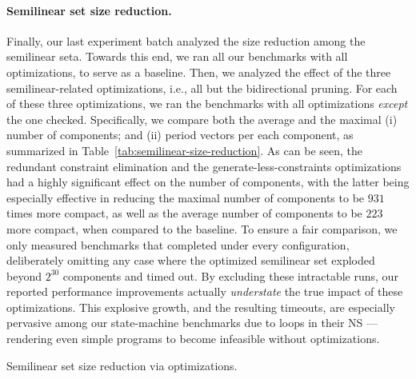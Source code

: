 \paragraph{Semilinear set size reduction.}

Finally, our last experiment batch analyzed the size reduction among the semilinear seta.
%
Towards this end, we ran all our benchmarks with all optimizations, to serve as a baseline. 
%
Then, we analyzed the effect of the three semilinear-related optimizations, i.e., all but the bidirectional pruning. For each of these three optimizations, we ran the benchmarks with all optimizations \textit{except} the one checked.
%
%
Specifically, we compare both the average and the maximal (i) number of components; and (ii) period vectors per each component, as summarized in Table~\ref{tab:semilinear-size-reduction}.
%
As can be seen, the redundant constraint elimination and the generate-less-constraints optimizations had a highly significant effect on the number of components, with the latter being especially effective in reducing the maximal number of components to be $931$ times more compact, as well as the average number of components to be $223$ more compact, when compared to the baseline.
%
To ensure a fair comparison, we only measured benchmarks that completed under every configuration, deliberately omitting any case where the optimized semilinear set exploded beyond $2^{30}$ components and timed out. By excluding these intractable runs, our reported performance improvements actually \textit{understate} the true impact of these optimizations. This explosive growth, and the resulting timeouts, are especially pervasive among our state-machine benchmarks due to loops in their NS --- rendering even simple programs to become infeasible without optimizations.




\begin{table}[htbp]
	\centering
	
	\caption{Semilinear set size reduction via optimizations.}
	\label{tab:semilinear-size-reduction}
\end{table}





